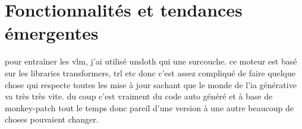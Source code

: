 \section{Fonctionnalités et tendances émergentes}
pour entraîner les vlm, j'ai utilisé unsloth qui une surcouche. ce moteur est basé sur les libraries transformers, trl etc donc c'est assez compliqué de faire quelque chose qui respecte toutes les mise à jour
sachant que le monde de l'ia générative va très très vite. du coup c'est vraiment du code auto généré et à base de monkey-patch tout le temps donc pareil d'une version à une autre beaucoup de choses pouvaient changer.



